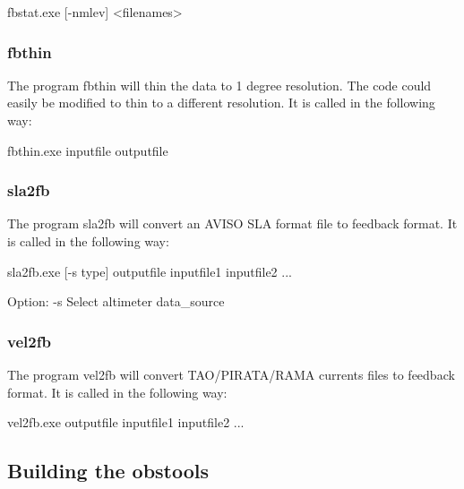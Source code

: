 \documentclass[../main/NEMO_manual]{subfiles}
\begin{document}
\begin{cmds}
fbstat.exe [-nmlev] <filenames>
\end{cmds}

\subsubsection{fbthin}

The program fbthin will thin the data to 1 degree resolution.
The code could easily be modified to thin to a different resolution.
It is called in the following way:

\begin{cmds}
fbthin.exe inputfile outputfile
\end{cmds}

\subsubsection{sla2fb}

The program sla2fb will convert an AVISO SLA format file to feedback format.
It is called in the following way:

\begin{cmds}
sla2fb.exe [-s type] outputfile inputfile1 inputfile2 ...

Option:
     -s            Select altimeter data_source
\end{cmds}

\subsubsection{vel2fb}

The program vel2fb will convert TAO/PIRATA/RAMA currents files to feedback format.
It is called in the following way:

\begin{cmds}
vel2fb.exe outputfile inputfile1 inputfile2 ...
\end{cmds}

\subsection{Building the obstools}
\end{document}
